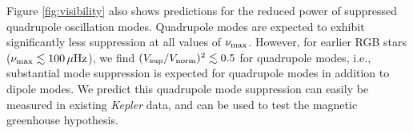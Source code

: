 Figure \ref{fig:visibility} also shows predictions for the reduced power of suppressed quadrupole oscillation modes. Quadrupole modes are expected to exhibit significantly less suppression at all values of $\nu_{\rm max}$. However, for earlier RGB stars ($\nu_{\rm max} \lesssim 100 \, \mu {\rm Hz}$), we find $(V_{\rm sup}/V_{\rm norm})^2 \lesssim 0.5 $ for quadrupole modes, i.e., substantial mode suppression is expected for quadrupole modes in addition to dipole modes. We predict this quadrupole mode suppression can easily be measured in existing {\it Kepler} data, and can be used to test the magnetic greenhouse hypothesis. 
  